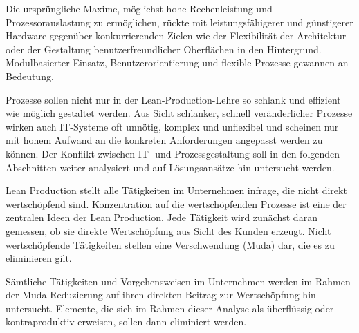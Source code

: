 Die ursprüngliche Maxime, möglichst hohe Rechenleistung und Prozessorauslastung zu ermöglichen, rückte mit leistungsfähigerer und günstigerer Hardware gegenüber konkurrierenden Zielen wie der Flexibilität der Architektur oder der Gestaltung benutzerfreundlicher Oberflächen in den Hintergrund. Modulbasierter Einsatz, Benutzerorientierung und flexible Prozesse gewannen an Bedeutung.

Prozesse sollen nicht nur in der Lean-Production-Lehre so schlank und effizient wie möglich gestaltet werden. Aus Sicht schlanker, schnell veränderlicher Prozesse wirken auch IT-Systeme oft unnötig, komplex und unflexibel und scheinen nur mit hohem Aufwand an die konkreten Anforderungen angepasst werden zu können. Der Konflikt zwischen IT- und Prozessgestaltung soll in den folgenden Abschnitten weiter analysiert und auf Lösungsansätze hin untersucht werden.

Lean Production stellt alle Tätigkeiten im Unternehmen infrage, die nicht direkt wertschöpfend sind.
Konzentration auf die wertschöpfenden Prozesse ist eine der zentralen Ideen der Lean Production. Jede Tätigkeit wird zunächst daran gemessen, ob sie direkte Wertschöpfung aus Sicht des Kunden erzeugt. Nicht wertschöpfende Tätigkeiten stellen eine Verschwendung (Muda) dar, die es zu eliminieren gilt.
      
Sämtliche Tätigkeiten und Vorgehensweisen im Unternehmen werden im Rahmen der Muda-Reduzierung auf ihren direkten Beitrag zur Wertschöpfung hin untersucht. Elemente, die sich im Rahmen dieser Analyse als überflüssig oder kontraproduktiv erweisen, sollen dann eliminiert werden.






